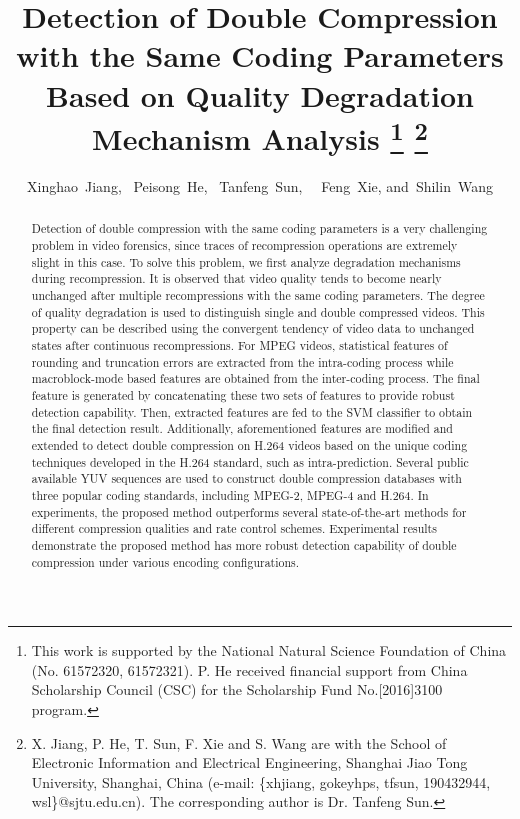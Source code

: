 \documentclass[journal,sort]{IEEEtran}
\begin{document}
\title{Detection of Double Compression with the Same Coding Parameters Based on Quality Degradation Mechanism Analysis \thanks{This work is supported by the National Natural Science Foundation of China (No. 61572320, 61572321). P. He received financial support from China Scholarship Council (CSC) for the Scholarship Fund No.[2016]3100 program.}
\thanks{X. Jiang, P. He, T. Sun, F. Xie and S. Wang are with the School of Electronic Information and Electrical Engineering, Shanghai Jiao Tong University, Shanghai, China (e-mail: \{xhjiang, gokeyhps, tfsun, 190432944, wsl\}@sjtu.edu.cn). The corresponding author is Dr. Tanfeng Sun.}}	


\author{Xinghao~Jiang,~
	Peisong~He,~
	Tanfeng~Sun,~%
	~Feng~Xie,
	and~Shilin~Wang}

\maketitle



\begin{abstract}
Detection of double compression with the same coding parameters is a very challenging problem in video forensics, since traces of recompression operations are extremely slight in this case. To solve this problem, we first analyze degradation mechanisms during recompression. It is observed that video quality tends to become nearly unchanged after multiple recompressions with the same coding parameters. The degree of quality degradation is used to distinguish single and double compressed videos. This property can be described using the convergent tendency of video data to unchanged states after continuous recompressions. For MPEG videos, statistical features of rounding and truncation errors are extracted from the intra-coding process while macroblock-mode based features are obtained from the inter-coding process. The final feature is generated by concatenating these two sets of features to provide robust detection capability. Then, extracted features are fed to the SVM classifier to obtain the final detection result. Additionally, aforementioned features are modified and extended to detect double compression on H.264 videos based on the unique coding techniques developed in the H.264 standard, such as intra-prediction. Several public available YUV sequences are used to construct double compression databases with three popular coding standards, including MPEG-2, MPEG-4 and H.264. In experiments, the proposed method outperforms several state-of-the-art methods for different compression qualities and rate control schemes. Experimental results demonstrate the proposed method has more robust detection capability of double compression under various encoding configurations. 
 

\end{abstract}
\end{document}
